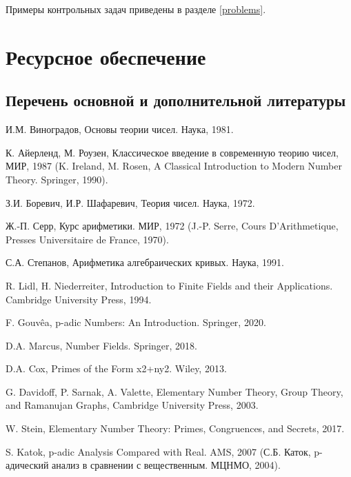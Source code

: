 \documentclass[a4paper, 12pt]{article}
\begin{document}
Примеры контрольных задач приведены в разделе \ref{problems}.

\section{Ресурсное обеспечение}

\subsection{Перечень основной и дополнительной литературы}

\begin{thebibliography}{Serre}
    
    И.М. Виноградов, Основы теории чисел. Наука, 1981.

    К. Айерленд, М. Роузен, Классическое введение в современную теорию чисел, МИР, 1987 (K. Ireland, M. Rosen, A Classical Introduction to Modern Number Theory. Springer, 1990).

    З.И. Боревич, И.Р. Шафаревич, Теория чисел. Наука, 1972.

    Ж.-П. Серр, Курс арифметики. МИР, 1972 (J.-P. Serre, Cours D’Arithmetique, Presses Universitaire de France, 1970).

    С.А. Степанов, Арифметика алгебраических кривых. Наука, 1991.

    R. Lidl, H. Niederreiter, Introduction to Finite Fields and their Applications. Cambridge University Press, 1994.

    F. Gouvêa, p-adic Numbers: An Introduction. Springer, 2020.

    D.A. Marcus, Number Fields. Springer, 2018.

    D.A. Cox, Primes of the Form x2+ny2. Wiley, 2013.

    G. Davidoff, P. Sarnak, A. Valette, Elementary Number Theory, Group Theory, and Ramanujan Graphs, Cambridge University Press, 2003.

    W. Stein, Elementary Number Theory: Primes, Congruences, and Secrets, 2017.

     S. Katok, p-adic Analysis Compared with Real. AMS, 2007 (С.Б. Каток, p-адический анализ в сравнении с вещественным. МЦНМО, 2004).

\end{thebibliography}
\end{document}
